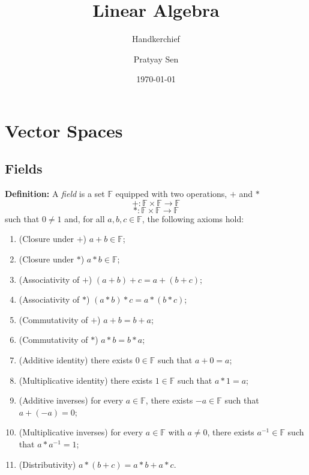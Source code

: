 \documentclass[a4paper,11pt,abstract=true]{scrartcl}
\theoremstyle{dotlessP}
\theoremstyle{dotlessS}
\theoremstyle{remark}
\theoremstyle{definition}
\begin{document}


\title{Linear Algebra}
\subtitle{Handkerchief}
\author{Pratyay Sen}
\date{\today}

\maketitle

\tableofcontents

\clearpage



\section{Vector Spaces}

\subsection{Fields}

\textbf{Definition:} A \emph{field} is a set $\mathbb{F}$ equipped with two operations,
$+$ and $*$
\[
+:\mathbb{F}\times \mathbb{F}\longrightarrow \mathbb{F}
\]
\[
*:\mathbb{F}\times \mathbb{F}\longrightarrow \mathbb{F}
\]
such that $0\neq1$ and, for all $a,b,c\in \mathbb{F}$, the following axioms hold:
\begin{enumerate}
    \item (Closure under $+$) $a+b\in \mathbb{F}$;
    \item (Closure under $*$) $a*b\in \mathbb{F}$;
    \item (Associativity of $+$) $(a+b)+c=a+(b+c)$;
    \item (Associativity of $*$) $(a*b)*c=a*(b*c)$;
    \item (Commutativity of $+$) $a+b=b+a$;
    \item (Commutativity of $*$) $a*b=b*a$;
    \item (Additive identity) there exists $0\in \mathbb{F}$ such that
    $a+0=a$;
    \item (Multiplicative identity) there exists $1\in \mathbb{F}$ such that
    $a*1=a$;
    \item (Additive inverses) for every $a\in \mathbb{F}$, there exists $-a\in \mathbb{F}$
    such that $a+(-a)=0$;
    \item (Multiplicative inverses) for every $a\in \mathbb{F}$ with $a\neq0$,
    there exists $a^{-1}\in \mathbb{F}$ such that $a*a^{-1}=1$;
    \item (Distributivity) $a*(b+c)=a*b+a*c$.
\end{enumerate}
\end{document}
